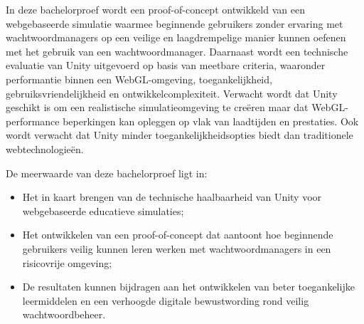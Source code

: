 In deze bachelorproef wordt een proof-of-concept ontwikkeld van een webgebaseerde simulatie waarmee beginnende gebruikers zonder ervaring met wachtwoordmanagers op een veilige en laagdrempelige manier kunnen oefenen met het gebruik van een wachtwoordmanager. 
Daarnaast wordt een technische evaluatie van Unity uitgevoerd op basis van meetbare criteria, waaronder performantie binnen een WebGL-omgeving, toegankelijkheid, gebruiksvriendelijkheid en ontwikkelcomplexiteit. 
Verwacht wordt dat Unity geschikt is om een realistische simulatieomgeving te creëren maar dat WebGL-performance beperkingen kan opleggen op vlak van laadtijden en prestaties. Ook wordt verwacht dat Unity minder toegankelijkheidsopties biedt dan traditionele webtechnologieën.

De meerwaarde van deze bachelorproef ligt in:
\begin{itemize} 
  \item Het in kaart brengen van de technische haalbaarheid van Unity voor webgebaseerde educatieve simulaties; 
  \item Het ontwikkelen van een proof-of-concept dat aantoont hoe beginnende gebruikers veilig kunnen leren werken met wachtwoordmanagers in een risicovrije omgeving;
  \item De resultaten kunnen bijdragen aan het ontwikkelen van beter toegankelijke leermiddelen en een verhoogde digitale bewustwording rond veilig wachtwoordbeheer.
\end{itemize}

